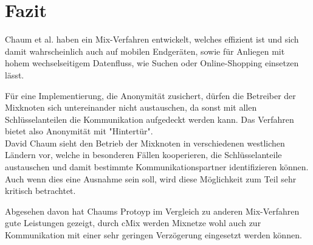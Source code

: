 \documentclass[
    fontsize=12pt,
    headings=small,
    parskip=half,           %
    bibliography=totoc,
    numbers=noenddot,       %
    open=any,               %
    ]{scrreprt}
\begin{document}
\chapter{Fazit}

Chaum et al. haben ein Mix-Verfahren entwickelt, welches effizient ist und sich damit wahrscheinlich auch auf mobilen Endgeräten, sowie für Anliegen mit hohem wechselseitigem Datenfluss, wie Suchen oder Online-Shopping einsetzen lässt.

Für eine Implementierung, die Anonymität zusichert, dürfen die Betreiber der Mixknoten sich untereinander nicht austauschen, da sonst mit allen Schlüsselanteilen die Kommunikation aufgedeckt werden kann.
Das Verfahren bietet also Anonymität mit "Hintertür".\\
David Chaum sieht den Betrieb der Mixknoten in verschiedenen westlichen Ländern vor, welche in besonderen Fällen kooperieren, die Schlüsselanteile austauschen und damit bestimmte Kommunikationspartner identifizieren können.
Auch wenn dies eine Ausnahme sein soll, wird diese Möglichkeit zum Teil sehr kritisch betrachtet.

Abgesehen davon hat Chaums Protoyp im Vergleich zu anderen Mix-Verfahren gute Leistungen gezeigt, durch cMix werden Mixnetze wohl auch zur Kommunikation mit einer sehr geringen Verzögerung eingesetzt werden können.



\end{document}
